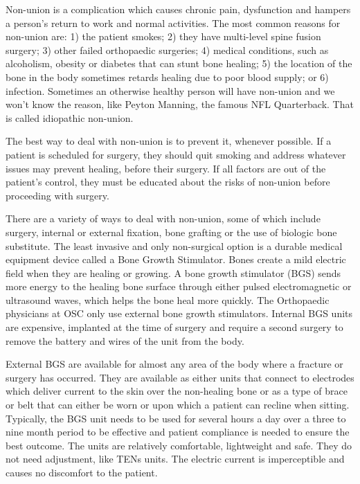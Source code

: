 \documentclass[12pt]{article}
\begin{document}
Non-union is a complication which causes chronic pain, dysfunction and hampers a person’s return to work and normal activities.  The most common reasons for non-union are: 1) the patient smokes; 2) they have multi-level spine fusion surgery; 3) other failed orthopaedic surgeries; 4) medical conditions, such as alcoholism, obesity or diabetes that can stunt bone healing; 5) the location of the bone in the body sometimes retards healing due to poor blood supply; or 6) infection.  Sometimes an otherwise healthy person will have non-union and we won’t know the reason, like Peyton Manning, the famous NFL Quarterback. That is called idiopathic non-union.

\indent

The best way to deal with non-union is to prevent it, whenever possible. If a patient is scheduled for surgery, they should quit smoking and address whatever issues may prevent healing, before their surgery.  If all factors are out of the patient’s control, they must be educated about the risks of non-union before proceeding with surgery.

\indent

There are a variety of ways to deal with non-union, some of which include surgery, internal or external fixation, bone grafting or the use of biologic bone substitute. The least invasive and only non-surgical option is a durable medical equipment device called a Bone Growth Stimulator. Bones create a mild electric field when they are healing or growing.  A bone growth stimulator (BGS) sends more energy to the healing bone surface through either pulsed electromagnetic or ultrasound waves, which helps the bone heal more quickly. The Orthopaedic physicians at OSC only use external bone growth stimulators.  Internal BGS units are expensive, implanted at the time of surgery and require a second surgery to remove the battery and wires of the unit from the body.

\indent

External BGS are available for almost any area of the body where a fracture or surgery has occurred.  They are available as either units that connect to electrodes which deliver current to the skin over the non-healing bone or as a type of brace or belt that can either be worn or upon which a patient can recline when sitting.  Typically, the BGS unit needs to be used for several hours a day over a three to nine month period to be effective and patient compliance is needed to ensure the best outcome.  The units are relatively comfortable, lightweight and safe.  They do not need adjustment, like TENs units.  The electric current is imperceptible and causes no discomfort to the patient.
\end{document}
